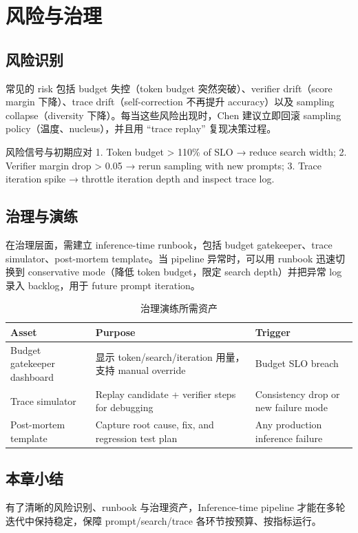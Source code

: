 \section{风险与治理}

\subsection{风险识别}
常见的 risk 包括 budget 失控（token budget 突然突破）、verifier drift（score margin 下降）、trace drift（self-correction 不再提升 accuracy）以及 sampling collapse（diversity 下降）。每当这些风险出现时，Chen 建议立即回滚 sampling policy（温度、nucleus），并且用 “trace replay” 复现决策过程。

\begin{warningbox}{风险信号与初期应对}
1. Token budget > 110\% of SLO → reduce search width; 2. Verifier margin drop > 0.05 → rerun sampling with new prompts; 3. Trace iteration spike → throttle iteration depth and inspect trace log.
\end{warningbox}

\subsection{治理与演练}
在治理层面，需建立 inference-time runbook，包括 budget gatekeeper、trace simulator、post-mortem template。当 pipeline 异常时，可以用 runbook 迅速切换到 conservative mode（降低 token budget，限定 search depth）并把异常 log 录入 backlog，用于 future prompt iteration。

\begin{table}[H]
\centering
\caption{治理演练所需资产}
\begin{tabular}{p{}p{}p{}}
\toprule
Asset & Purpose & Trigger \\
\midrule
Budget gatekeeper dashboard & 显示 token/search/iteration 用量，支持 manual override & Budget SLO breach \\
Trace simulator & Replay candidate + verifier steps for debugging & Consistency drop or new failure mode \\
Post-mortem template & Capture root cause, fix, and regression test plan & Any production inference failure \\
\bottomrule
\end{tabular}
\end{table}

\subsection{本章小结}
有了清晰的风险识别、runbook 与治理资产，Inference-time pipeline 才能在多轮迭代中保持稳定，保障 prompt/search/trace 各环节按预算、按指标运行。

